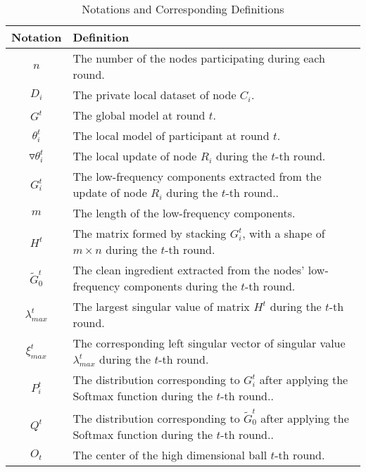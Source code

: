 \documentclass[lettersize,journal]{IEEEtran}
\begin{document}
\begin{table*}[h]
\centering
\caption{Notations and Corresponding Definitions}
\label{tabl:notations}
\begin{tabular}{|c|l|}
\hline
\textbf{Notation} & \textbf{Definition} \\ \hline
$ n $ & The number of the nodes participating during each round. \\ \hline
$D_i$ & The private local dataset of node $C_i$. \\ \hline

$G^t$ & The global model at round $t$. \\ \hline
$\theta_i^t$ & The local model of participant at round $t$. \\ \hline
$\triangledown \theta_i^t$ & The local update of node $R_i$ during the $t$-th round. \\ \hline
$G_i^t $ & The low-frequency components extracted from the update of node $R_i$ during the $t$-th round.. \\ \hline
$m$ & The length of the low-frequency components. \\ \hline
$H^t$ & The matrix formed by stacking $G_i^t$, with a shape of $m \times n$ during the $t$-th round. \\ \hline
$\tilde{G}_{0}^t $ & The clean ingredient extracted from the nodes' low-frequency components during the $t$-th round. \\ \hline
$\lambda_{max}^t$ & The largest singular value of matrix $H^t$ during the $t$-th round. \\ \hline
$\xi_{max}^t$ & The corresponding left singular vector of singular value $\lambda_{max}^t$ during the $t$-th round. \\ \hline
$P_i^t$ & The distribution corresponding to $G_i^t$ after applying the Softmax function during the $t$-th round.. \\ \hline
$Q^t$ &  The distribution corresponding to $\tilde{G}_{0}^t$ after applying the Softmax function during the $t$-th round.. \\ \hline
$O_t$ &  The center of the high dimensional ball $t$-th round. \\ \hline


\end{tabular}
\end{table*}
\end{document}
